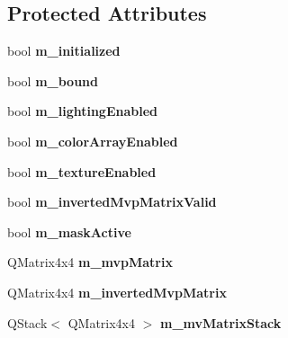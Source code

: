\subsection*{Protected Attributes}
\begin{DoxyCompactItemize}
\item 
\mbox{\label{class_g_l_e_s_renderer_a2c936870131300b9ed86cf9073747637}} 
bool {\bfseries m\+\_\+initialized}
\item 
\mbox{\label{class_g_l_e_s_renderer_ab4227a6b3394b7392c9a7001fc306ad1}} 
bool {\bfseries m\+\_\+bound}
\item 
\mbox{\label{class_g_l_e_s_renderer_a89a023d2cabec874691841f5ff140bc8}} 
bool {\bfseries m\+\_\+lighting\+Enabled}
\item 
\mbox{\label{class_g_l_e_s_renderer_a71b59ce0e9ae03eba0ed065bae8ecff7}} 
bool {\bfseries m\+\_\+color\+Array\+Enabled}
\item 
\mbox{\label{class_g_l_e_s_renderer_a61680a3953bfb6b22e7131a518b1a5e2}} 
bool {\bfseries m\+\_\+texture\+Enabled}
\item 
\mbox{\label{class_g_l_e_s_renderer_a9c58c18b9b58fb4f49bb1fd79f4a2f51}} 
bool {\bfseries m\+\_\+inverted\+Mvp\+Matrix\+Valid}
\item 
\mbox{\label{class_g_l_e_s_renderer_a8e58a3bbfb5ba75c48cc35b06711131c}} 
bool {\bfseries m\+\_\+mask\+Active}
\item 
\mbox{\label{class_g_l_e_s_renderer_a878a3ee8fe04d1a56659c78ba5e95f4b}} 
Q\+Matrix4x4 {\bfseries m\+\_\+mvp\+Matrix}
\item 
\mbox{\label{class_g_l_e_s_renderer_af08d271c05f553df400b67685435cb0c}} 
Q\+Matrix4x4 {\bfseries m\+\_\+inverted\+Mvp\+Matrix}
\item 
\mbox{\label{class_g_l_e_s_renderer_a5675ffb62f73dc7ebff3e4aea59db56e}} 
Q\+Stack$<$ Q\+Matrix4x4 $>$ {\bfseries m\+\_\+mv\+Matrix\+Stack}

\end{DoxyCompactItemize}

